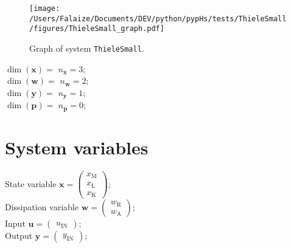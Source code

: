 \documentclass[11pt, oneside]{article}      %
\begin{document}
%
    \begin{figure}[!h]
    \begin{center}
    \texttt{[image: /Users/Falaize/Documents/DEV/python/pypHs/tests/ThieleSmall/figures/ThieleSmall\_graph.pdf]}
    \caption{\label{fig:graph_ThieleSmall} Graph of system \texttt{ThieleSmall}. }
    \end{center}
    \end{figure}
%
$\dim(\mathbf{x})=$ $ n_\mathbf{x} = 3 ; $ 
%
\\
%
$\dim(\mathbf{w})=$ $ n_\mathbf{w} = 2 ; $ 
%
\\
%
$\dim(\mathbf{y})=$ $ n_\mathbf{y} = 1 ; $ 
%
\\
%
$\dim(\mathbf{p})=$ $ n_\mathbf{p} = 0 ; $ 
%
\\
%
%
\section{System variables}
%
State variable $ \mathbf{x} = \left(\begin{array}{c}x_{\mathrm{M}}\\x_{\mathrm{L}}\\x_{\mathrm{K}}\end{array}\right) ; $ 
%
\\
%
Dissipation variable $ \mathbf{w} = \left(\begin{array}{c}w_{\mathrm{R}}\\w_{\mathrm{A}}\end{array}\right) ; $ 
%
\\
%
Input $ \mathbf{u} = \left(\begin{array}{c}u_{\mathrm{IN}}\end{array}\right) ; $ 
%
\\
%
Output $ \mathbf{y} = \left(\begin{array}{c}y_{\mathrm{IN}}\end{array}\right) ; $ 
%
\\
%
%
\end{document}
